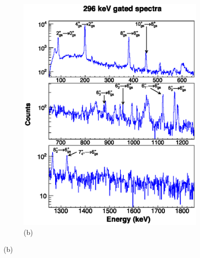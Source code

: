     \begin{figure}
    \ContinuedFloat
    \begin{subfigure}{\textwidth}
    \includegraphics[scale=1.3]{156GdTablesAndFigs/296_gamma.eps}
    \caption*{(b)}
    \label{fig:156_6to4spec}
    \end{subfigure}
\end{figure}